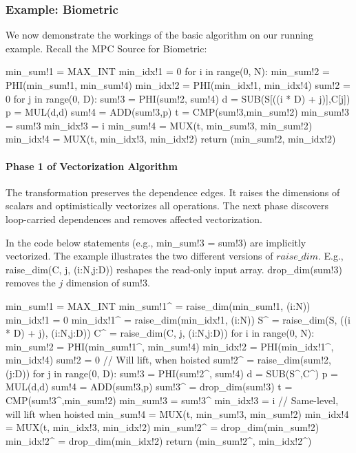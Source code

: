 
%

\subsubsection{Example: Biometric}

We now demonstrate the workings of the basic algorithm on our running example. Recall the MPC Source for Biometric:

{\small
\begin{pythonn}
min_sum!1 = MAX_INT
min_idx!1 = 0
for i in range(0, N):
   min_sum!2 = PHI(min_sum!1, min_sum!4)
   min_idx!2 = PHI(min_idx!1, min_idx!4)
   sum!2 = 0
   for j in range(0, D):
      sum!3 = PHI(sum!2, sum!4)
      d = SUB(S[((i * D) + j)],C[j])
      p = MUL(d,d)
      sum!4 = ADD(sum!3,p)
   t = CMP(sum!3,min_sum!2)
   min_sum!3 = sum!3
   min_idx!3 = i
   min_sum!4 = MUX(t, min_sum!3, min_sum!2)
   min_idx!4 = MUX(t, min_idx!3, min_idx!2)
return (min_sum!2, min_idx!2)

\end{pythonn}
}

\paragraph{Phase 1 of Vectorization Algorithm}

The transformation preserves the dependence edges. It raises the dimensions of scalars and optimistically vectorizes all operations. 
The next phase discovers loop-carried dependences and removes affected vectorization.

In the code below statements (e.g., {\sf min\_sum!3 = sum!3}) are implicitly vectorized. 
The example illustrates the two different versions of $\mathit{raise\_dim}$. E.g., {\sf raise\_dim(C, j, (i:N,j:D))} reshapes
the read-only input array. {\sf drop\_dim(sum!3)} removes the $j$ dimension of {\sf sum!3}.

{\small
\begin{pythonn}
min_sum!1 = MAX_INT
min_sum!1^ = raise_dim(min_sum!1, (i:N))
min_idx!1 = 0
min_idx!1^ = raise_dim(min_idx!1, (i:N))
S^ = raise_dim(S, ((i * D) + j), (i:N,j:D))
C^ = raise_dim(C, j, (i:N,j:D))
for i in range(0, N):
   min_sum!2 = PHI(min_sum!1^, min_sum!4)
   min_idx!2 = PHI(min_idx!1^, min_idx!4) 
   sum!2 = 0 // Will lift, when hoisted
   sum!2^ = raise_dim(sum!2, (j:D)) 
   for j in range(0, D):
      sum!3 = PHI(sum!2^, sum!4)
      d = SUB(S^,C^)
      p = MUL(d,d) 
      sum!4 = ADD(sum!3,p)
   sum!3^ = drop_dim(sum!3)     
   t = CMP(sum!3^,min_sum!2)
   min_sum!3 = sum!3^
   min_idx!3 = i  // Same-level, will lift when hoisted
   min_sum!4 = MUX(t, min_sum!3, min_sum!2)
   min_idx!4 = MUX(t, min_idx!3, min_idx!2)
min_sum!2^ = drop_dim(min_sum!2)
min_idx!2^ = drop_dim(min_idx!2)   
return (min_sum!2^, min_idx!2^)     
\end{pythonn}
}

